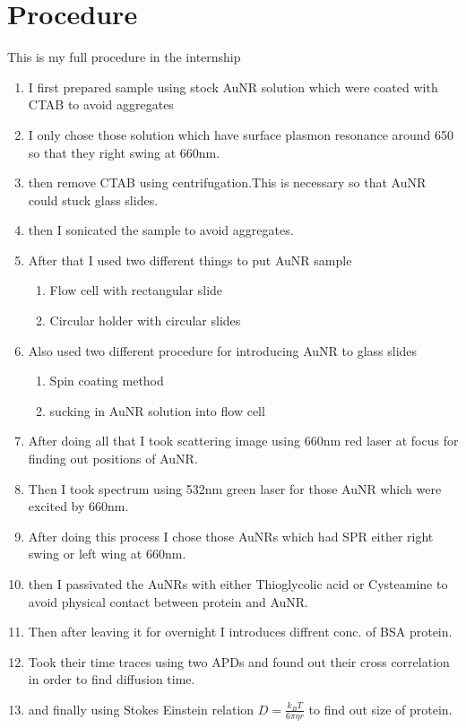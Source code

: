 \documentclass[twoside,single]{lion-msc}
\begin{document}
\section{Procedure}
This is my full procedure in the internship
 \begin{enumerate}[I]
   \item I first prepared sample using stock AuNR solution which were coated with CTAB to avoid aggregates
   \item I only chose those solution which have surface plasmon resonance around 650 so that they right swing at 660nm.
   \item then remove CTAB using centrifugation.This is necessary so that AuNR could stuck glass slides.
   \item then I sonicated the sample to avoid aggregates.
   \item After that I used two different things to put AuNR sample
   \begin{enumerate}[i]
   \item Flow cell with rectangular slide
   \item Circular holder with circular slides
   \end{enumerate}
   \item Also used two different procedure for introducing AuNR to glass slides
   \begin{enumerate}[i]
   \item Spin coating method 
   \item sucking in AuNR solution into flow cell
   \end{enumerate}
   \item After doing all that I took scattering image using 660nm red laser at focus for finding out positions of AuNR.
   \item Then I took spectrum using 532nm green laser for those AuNR which were excited by 660nm.
   \item After doing this process I chose those AuNRs which had SPR either right swing or left wing at 660nm.
   \item then I passivated the AuNRs with either Thioglycolic acid or Cysteamine to avoid physical contact between protein and AuNR.
   \item Then after leaving it for overnight I introduces diffrent conc. of BSA protein.
   \item Took their time traces using two APDs and found out their cross correlation in order to find diffusion time.
   \item and finally using Stokes Einstein relation $ D = \frac{k_B{T}}{6\pi\eta{r}}$ to find out size of protein.
   \end{enumerate}
\end{document}
